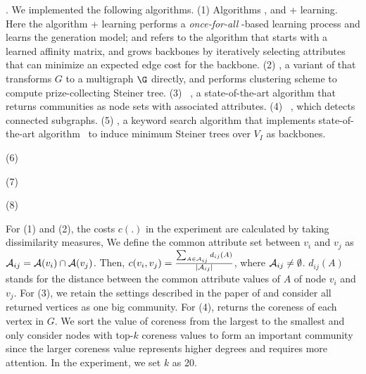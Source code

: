 . We implemented the following  algorithms. 
(1) Algorithms \approxabd, \heuabd and \heuabd + learning. Here 
the algorithm \heuabd + learning performs a {\em once-for-all} \EM-based
learning process and learns the generation model; and 
\heuabd refers to the algorithm that starts with a learned affinity matrix, 
and grows backbones by iteratively selecting attributes that can minimize an expected edge cost for the backbone.  
(2) \naive, a variant of \approxabd that
transforms $G$ to a multigraph $\G$ directly, and
performs clustering scheme to compute prize-collecting Steiner tree.
(3) \cesna~\cite{yang2013community}, a
state-of-the-art algorithm that returns
communities as node sets with associated attributes.
(4) \kcore~\cite{khaouid2015k},
which detects connected subgraphs.
(5) \ks, a keyword search algorithm 
that implements 
state-of-the-art algorithm~\cite{gubichev2012fast} 
to induce minimum Steiner trees over $V_I$ 
as backbones. 
\vspace{.5ex}

(6)

(7)

(8)

\vspace{.5ex}
For (1) and (2), the costs $c(.)$ in the experiment are calculated by taking dissimilarity measures, We 
define the common attribute set between $v_i$ and $v_j$ as ${\A_{ij} = \A(v_i)\cap\A(v_j)}$. Then, ${c(v_i,v_j) = \frac{\sum_{A \in \A_{ij}}d_{ij}(A)}{|\A_{ij}|}}$, where ${\A_{ij} \neq \emptyset}$. $d_{ij}(A)$ stands for the distance between the common attribute values of $A$ of node $v_i$ and $v_j$. For (3), we retain the settings described in the paper of \cesna and consider all returned vertices as one big community. For (4), \kcore returns the coreness of each vertex in $G$. We sort the value of coreness from the largest to the smallest and only consider nodes with top-$k$ coreness values to form an important community since the larger coreness value represents higher degrees and requires more attention. In the experiment, we set $k$ as 20.

